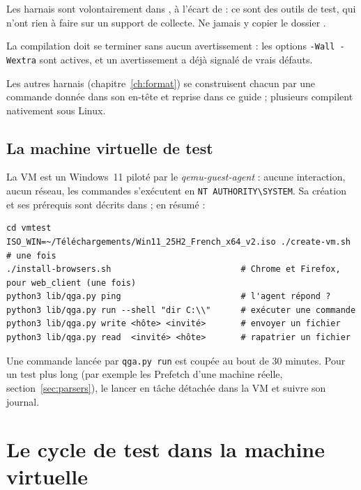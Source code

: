 \documentclass[11pt,a4paper,oneside]{report}
\begin{document}
\begin{attention}
Les harnais sont volontairement dans , à
l'écart de  : ce sont des outils de test, qui n'ont rien à
faire sur un support de collecte. Ne jamais y copier le dossier
.
\end{attention}

La compilation doit se terminer sans aucun avertissement : les options
\texttt{-Wall -Wextra} sont actives, et un avertissement a déjà signalé de vrais
défauts.

Les autres harnais (chapitre~\ref{ch:format}) se construisent chacun par une
commande donnée dans son en-tête et reprise dans ce guide ; plusieurs compilent
nativement sous Linux.

\section{La machine virtuelle de test}

La VM est un Windows~11 piloté par le \emph{qemu-guest-agent} : aucune
interaction, aucun réseau, les commandes s'exécutent en
\texttt{NT AUTHORITY\textbackslash SYSTEM}. Sa création et ses prérequis sont
décrits dans  ; en résumé :

\begin{lstlisting}
cd vmtest
ISO_WIN=~/Téléchargements/Win11_25H2_French_x64_v2.iso ./create-vm.sh   # une fois
./install-browsers.sh                          # Chrome et Firefox, pour web_client (une fois)
python3 lib/qga.py ping                        # l'agent répond ?
python3 lib/qga.py run --shell "dir C:\\"      # exécuter une commande
python3 lib/qga.py write <hôte> <invité>       # envoyer un fichier
python3 lib/qga.py read  <invité> <hôte>       # rapatrier un fichier
\end{lstlisting}

\begin{note}
Une commande lancée par \texttt{qga.py run} est coupée au bout de 30 minutes.
Pour un test plus long (par exemple les Prefetch d'une machine réelle,
section~\ref{sec:parsers}), le lancer en tâche détachée dans la VM et suivre son
journal.
\end{note}

\chapter{Le cycle de test dans la machine virtuelle}\label{ch:vm}
\end{document}
